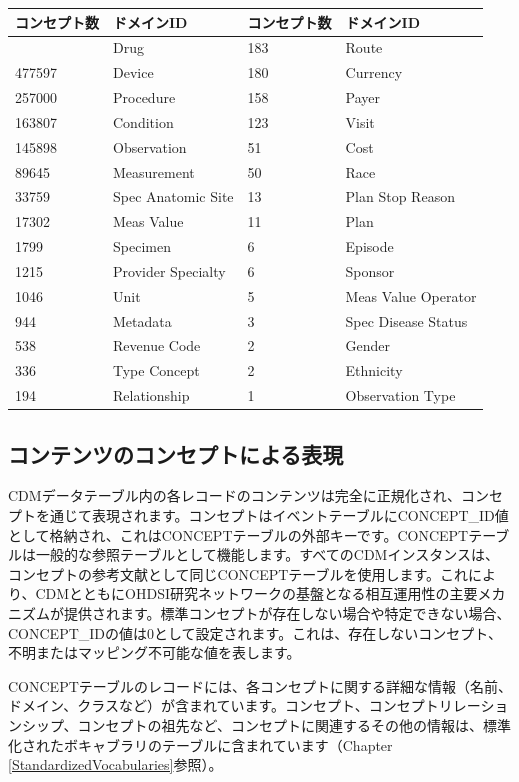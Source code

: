 \documentclass[
  11pt]{book}
\theoremstyle{definition}
\theoremstyle{definition}
\theoremstyle{definition}
\theoremstyle{definition}
\theoremstyle{remark}
\begin{document}
\begin{longtable}[]{@{}llll@{}}
\toprule\noalign{}
コンセプト数 & ドメインID & コンセプト数 & ドメインID \\
\midrule\noalign{}
\endhead
\bottomrule\noalign{}
\endlastfoot
1731378 & Drug & 183 & Route \\
477597 & Device & 180 & Currency \\
257000 & Procedure & 158 & Payer \\
163807 & Condition & 123 & Visit \\
145898 & Observation & 51 & Cost \\
89645 & Measurement & 50 & Race \\
33759 & Spec Anatomic Site & 13 & Plan Stop Reason \\
17302 & Meas Value & 11 & Plan \\
1799 & Specimen & 6 & Episode \\
1215 & Provider Specialty & 6 & Sponsor \\
1046 & Unit & 5 & Meas Value Operator \\
944 & Metadata & 3 & Spec Disease Status \\
538 & Revenue Code & 2 & Gender \\
336 & Type Concept & 2 & Ethnicity \\
194 & Relationship & 1 & Observation Type \\
\end{longtable}

\subsection{コンテンツのコンセプトによる表現}\label{ux30b3ux30f3ux30c6ux30f3ux30c4ux306eux30b3ux30f3ux30bbux30d7ux30c8ux306bux3088ux308bux8868ux73fe}

CDMデータテーブル内の各レコードのコンテンツは完全に正規化され、コンセプトを通じて表現されます。コンセプトはイベントテーブルにCONCEPT\_ID値として格納され、これはCONCEPTテーブルの外部キーです。CONCEPTテーブルは一般的な参照テーブルとして機能します。すべてのCDMインスタンスは、コンセプトの参考文献として同じCONCEPTテーブルを使用します。これにより、CDMとともにOHDSI研究ネットワークの基盤となる相互運用性の主要メカニズムが提供されます。標準コンセプトが存在しない場合や特定できない場合、CONCEPT\_IDの値は0として設定されます。これは、存在しないコンセプト、不明またはマッピング不可能な値を表します。

CONCEPTテーブルのレコードには、各コンセプトに関する詳細な情報（名前、ドメイン、クラスなど）が含まれています。コンセプト、コンセプトリレーションシップ、コンセプトの祖先など、コンセプトに関連するその他の情報は、標準化されたボキャブラリのテーブルに含まれています（Chapter \ref{StandardizedVocabularies}参照）。
\end{document}
